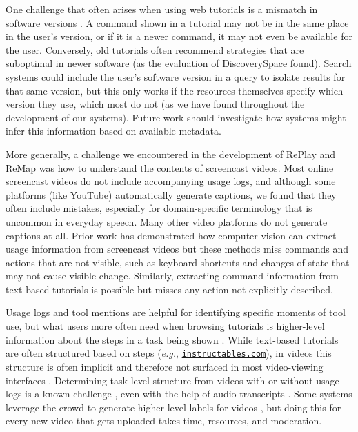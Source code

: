 One challenge that often arises when using web tutorials is a mismatch in software versions \cite{Lafreniere2013a}. A command shown in a tutorial may not be in the same place in the user's version, or if it is a newer command, it may not even be available for the user. Conversely, old tutorials often recommend strategies that are suboptimal in newer software (as the evaluation of Discovery\-Space found). Search systems could include the user's software version in a query to isolate results for that same version, but this only works if the resources themselves specify which version they use, which most do not (as we have found throughout the development of our systems). Future work should investigate how systems might infer this information based on available metadata.

More generally, a challenge we encountered in the development of RePlay and ReMap was how to understand the contents of screencast videos. Most online screencast videos do not include accompanying usage logs, and although some platforms (like YouTube) automatically generate captions, we found that they often include mistakes, especially for domain-specific terminology that is uncommon in everyday speech. Many other video platforms do not generate captions at all. Prior work has demonstrated how computer vision can extract usage information from screencast videos \cite{Banovic2012, Pongnumkul2011} but these methods miss commands and actions that are not visible, such as keyboard shortcuts and changes of state that may not cause visible change. Similarly, extracting command information from text-based tutorials is possible \cite{Pavel2013, Fourney2014Mining, Fourney2012, Fourney2011} but misses any action not explicitly described. 

Usage logs and tool mentions are helpful for identifying specific moments of tool use, but what users more often need when browsing tutorials is higher-level information about the steps in a task being shown \cite{Pongnumkul2011, Harrison1995, Chi2012, Kim2014}. While text-based tutorials are often structured based on steps (\textit{e.g.}, \href{https://www.instructables.com/}{\nolinkurl{instructables.com}}), in videos this structure is often implicit and therefore not surfaced in most video-viewing interfaces \cite{Pavel2014}. Determining task-level structure from videos with or without usage logs is a known challenge \cite{Pongnumkul2011, Chi2012, Grossman2010}, even with the help of audio transcripts \cite{Fraser2020}. Some systems leverage the crowd to generate higher-level labels for videos \cite{Kim2014, Weir2015}, but doing this for every new video that gets uploaded takes time, resources, and moderation. 


